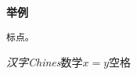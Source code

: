 \message{ !name(hello5.tex)}\documentclass[11pt]{ctexart}
\begin{document}

\huge\bf{举例}
\begin{verbatim}
标点。
\end{verbatim}
\textit{汉字}\textit{Chines}数学$x=y$空格
\end{document}
